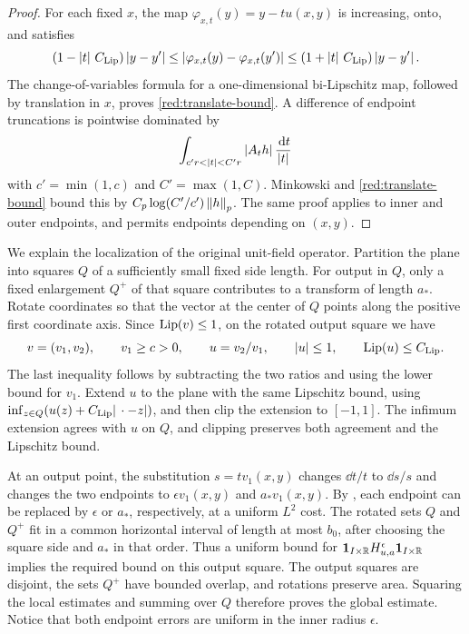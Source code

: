 \begin{proof}
For each fixed \(x\), the map
\(\varphi_{x,t}(y)=y-tu(x,y)\) is increasing, onto, and satisfies
\[
 (1-\left|t\right|\,C_{\rm Lip})\left|y-y'\right|
 \le\left|\varphi_{x,t}(y)-\varphi_{x,t}(y')\right|
 \le(1+\left|t\right|\,C_{\rm Lip})\left|y-y'\right|.
\]
The change-of-variables formula for a one-dimensional bi-Lipschitz
map, followed by translation in \(x\), proves
\eqref{red:translate-bound}. A difference of endpoint truncations
is pointwise dominated by
\[
 \int_{c' r<|t|<C' r}\abs{A_t h}\frac{\dd t}{|t|}
\]
with \(c'=\min(1,c)\) and \(C'=\max(1,C)\). Minkowski and
\eqref{red:translate-bound} bound this by
\(C_p\log(C'/c')\left\|h\right\|_p\). The same proof applies to inner
and outer endpoints, and permits endpoints depending on \((x,y)\).
\end{proof}

We explain the localization of the original unit-field operator.
Partition the plane into squares \(Q\) of a sufficiently small fixed
side length. For output in \(Q\), only a fixed enlargement \(Q^+\)
of that square contributes to a transform of length \(a_*\). Rotate
coordinates so that the vector at the center of \(Q\) points along
the positive first coordinate axis. Since \(\operatorname{Lip}(v)\le1\), on the
rotated output square we have
\[
 v=(v_1,v_2),\qquad v_1\ge c>0,
 \qquad u=v_2/v_1,\qquad \left|u\right|\le1,
 \qquad\operatorname{Lip}(u)\le C_{\rm Lip}.
\]
The last inequality follows by subtracting the two ratios and using
the lower bound for \(v_1\). Extend \(u\) to the plane with the
same Lipschitz bound, using
\(\inf_{z\in Q}(u(z)+C_{\rm Lip}|\,\cdot-z|)\), and then clip
the extension to \([-1,1]\). The infimum extension agrees with
\(u\) on \(Q\), and clipping preserves both agreement and the
Lipschitz bound.

At an output point, the substitution \(s=t v_1(x,y)\) changes
\(\dd t/t\) to \(\dd s/s\) and changes the two endpoints to
\(\epsilon v_1(x,y)\) and \(a_*v_1(x,y)\). By
, each endpoint can be replaced by
\(\epsilon\) or \(a_*\), respectively, at a uniform \(L^2\)
cost. The rotated sets \(Q\) and \(Q^+\) fit in a common
horizontal interval of length at most \(b_0\), after choosing the
square side and \(a_*\) in that order. Thus a uniform bound for
\(\mathbf 1_{I\times\mathbb R}H_{u,a}^{\epsilon}\mathbf 1_{I\times\mathbb R}\)
implies the required bound on this output square. The output squares
are disjoint, the sets \(Q^+\) have bounded overlap, and rotations
preserve area. Squaring the local estimates and summing over \(Q\)
therefore proves the global estimate. Notice that both endpoint
errors are uniform in the inner radius \(\epsilon\).

